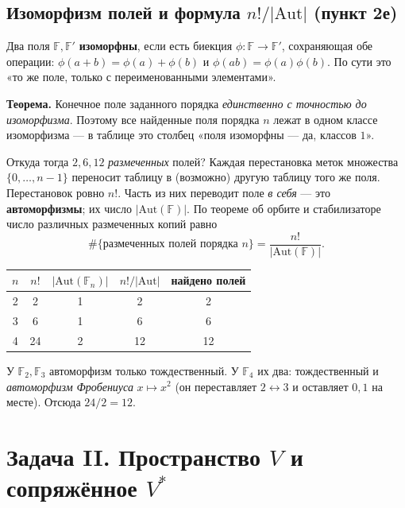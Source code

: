 \documentclass[11pt]{article}
\newcommand{\F}{\mathbb{F}}
\begin{document}
\subsection{Изоморфизм полей и формула \texorpdfstring{$n!/|\mathrm{Aut}|$}{n!/|Aut|} (пункт 2е)}

\begin{idea}[Изоморфизм]
Два поля $\F,\F'$ \textbf{изоморфны}, если есть биекция $\phi\colon\F\to\F'$, сохраняющая
обе операции: $\phi(a+b)=\phi(a)+\phi(b)$ и $\phi(ab)=\phi(a)\phi(b)$. По сути это «то же
поле, только с переименованными элементами».
\end{idea}

\textbf{Теорема.} Конечное поле заданного порядка \emph{единственно с точностью до
изоморфизма}. Поэтому все найденные поля порядка $n$ лежат в одном классе изоморфизма —
в таблице это столбец «поля изоморфны — да, классов $1$».

Откуда тогда $2,6,12$ \emph{размеченных} полей? Каждая перестановка меток множества
$\{0,\dots,n-1\}$ переносит таблицу в (возможно) другую таблицу того же поля. Перестановок
ровно $n!$. Часть из них переводит поле \emph{в себя} — это \textbf{автоморфизмы}; их число
$|\mathrm{Aut}(\F)|$. По теореме об орбите и стабилизаторе число различных размеченных
копий равно
\[
  \#\{\text{размеченных полей порядка }n\}=\frac{n!}{|\mathrm{Aut}(\F)|}.
\]

\begin{idea}
\centering
\begin{tabular}{c c c c c}
\toprule
$n$ & $n!$ & $|\mathrm{Aut}(\F_n)|$ & $n!/|\mathrm{Aut}|$ & найдено полей\\
\midrule
2 & 2  & 1 & 2  & 2\\
3 & 6  & 1 & 6  & 6\\
4 & 24 & 2 & 12 & 12\\
\bottomrule
\end{tabular}
\end{idea}

\noindent У $\F_2,\F_3$ автоморфизм только тождественный. У $\F_4$ их два: тождественный и
\emph{автоморфизм Фробениуса} $x\mapsto x^{2}$ (он переставляет $2\leftrightarrow 3$ и
оставляет $0,1$ на месте). Отсюда $24/2=12$.

\section{Задача II. Пространство $V$ и сопряжённое $V^{*}$}
\end{document}
